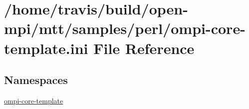 \hypertarget{ompi-core-template_8ini}{\section{/home/travis/build/open-\/mpi/mtt/samples/perl/ompi-\/core-\/template.ini File Reference}
\label{ompi-core-template_8ini}
}
\subsection*{Namespaces}
\begin{DoxyCompactItemize}
\item 
\hyperlink{namespaceompi-core-template}{ompi-\/core-\/template}
\end{DoxyCompactItemize}
